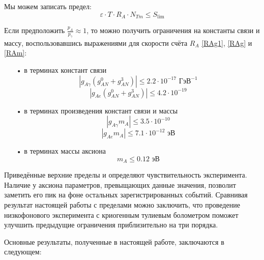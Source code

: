 \documentclass[a4paper,article,14pt]{extarticle}
\begin{document}
Мы можем записать предел:
\begin{equation}
   \varepsilon  \cdot T \cdot {R_A} \cdot N_{Tm} \leqslant {S_{\lim }}
\end{equation}

Если предположить $\frac{{{p_A}}}{{{p_\gamma}}} \approx 1$, то можно получить ограничения на константы связи и массу, воспользовавшись выражениями для скорости счёта ${R_A}$ \eqref{RAg1}, \eqref{RAg} и \eqref{RAm}:

\begin{enumerate}
    \item[•] в терминах констант связи
    \begin{equation}
         \left| g_{A\gamma}{\left( {g_{AN}^0 + g_{AN}^3} \right)} \right| \leqslant 2.2 \cdot 10^{-17} \text{ ГэВ}^{-1}
    \end{equation}
    \begin{equation}
         \left| g_{Ae}{\left( {g_{AN}^0 + g_{AN}^3} \right)} \right| \leqslant 4.2 \cdot 10^{-19}
    \end{equation}
    \item[•] в терминах произведения констант связи и массы
    \begin{equation}
        \left| {{g_{A\gamma}}{m_A}} \right| \leqslant 3.5 \cdot 10^{-10}
    \end{equation}
    \begin{equation}
        \left| {{g_{Ae}}{m_A}} \right| \leqslant 7.1 \cdot 10^{-12} \text{ эВ}
    \end{equation}
    \item[•] в терминах массы аксиона
    \begin{equation}
        m_A \leqslant 0.12 \text{ эВ}
    \end{equation}
\end{enumerate}

Приведённые верхние пределы и определяют чувствительность эксперимента. Наличие у аксиона параметров, превыщающих данные значения, позволит заметить его пик на фоне остальных зарегистрированных событий. Сравнивая результат настоящей работы с пределами \cite{newlimits_tm} можно заключить, что проведение низкофонового эксперимента с криогенным тулиевым болометром поможет улучшить предыдущие ограничения приблизительно на три порядка.

Основные результаты, полученные в настоящей работе, заключаются в следующем:
\end{document}
